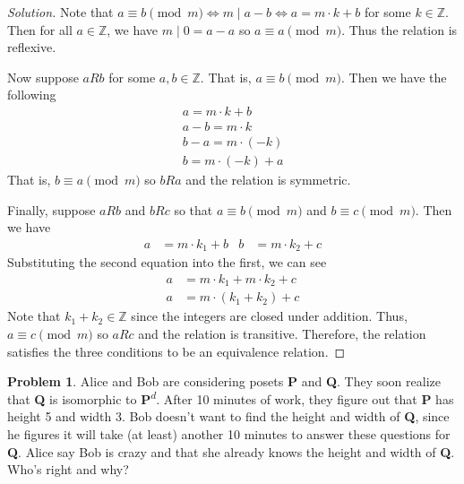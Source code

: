 \documentclass[12pt]{article}
\newcounter{chapternumber}
\theoremstyle{definition}
\newtheorem{problem-internal}{Problem}[chapternumber]
\newenvironment{problem}{
  \medskip
  \begin{problem-internal}
}{
\end{problem-internal}
}
\newenvironment{solution}{
  \begin{proof}[Solution]
    \vspace{-8px}
    \setlength{\parskip}{4px}
    \setlength{\parindent}{0px}
}{
\end{proof}
}
\begin{document}
  \begin{solution}
    Note that \(a \equiv b \pmod m \iff m \mid a - b \iff a = m \cdot k + b \) for some \(k \in \mathbb{Z}\). Then for all \(a \in \mathbb{Z}\), we have \(m \mid 0 = a - a\) so \(a \equiv a \pmod m\). Thus the relation is reflexive.

    Now suppose \(aRb\) for some \(a, b \in \mathbb{Z}\). That is, \(a \equiv b \pmod m\). Then we have the following
    \begin{gather*}
      a = m \cdot k + b \\
      a - b = m \cdot k \\
      b - a = m \cdot \left( -k \right) \\
      b = m \cdot \left( -k \right) + a
    \end{gather*}
    That is, \(b \equiv a \pmod m\) so \(bRa\) and the relation is symmetric.

    Finally, suppose \(aRb\) and \(bRc\) so that \(a \equiv b \pmod m\) and \(b \equiv c \pmod m\). Then we have
    \begin{align*}
      a &= m \cdot k_{1} + b & b &= m \cdot k_{2} + c
    \end{align*}
    Substituting the second equation into the first, we can see
    \begin{align*}
      a &= m \cdot k_{1} + m \cdot k_{2} + c \\
      a &= m \cdot \left(k_{1} + k_{2}\right) + c
    \end{align*}
    Note that \(k_{1} + k_{2} \in \mathbb{Z}\) since the integers are closed under addition. Thus, \(a \equiv c \pmod m\) so \(aRc\) and the relation is transitive. Therefore, the relation satisfies the three conditions to be an equivalence relation.
  \end{solution}

  \pagebreak

  \setcounter{problem-internal}{6}
  \begin{problem}
    Alice and Bob are considering posets \textbf{P} and \textbf{Q}. They soon realize that \textbf{Q} is isomorphic to \textbf{P}\textsuperscript{\(d\)}. After 10 minutes of work, they figure out that \textbf{P} has height 5 and width 3. Bob doesn't want to find the height and width of \textbf{Q}, since he figures it will take (at least) another 10 minutes to answer these questions for \textbf{Q}. Alice say Bob is crazy and that she already knows the height and width of \textbf{Q}. Who's right and why?
  \end{problem}
\end{document}
